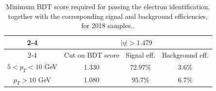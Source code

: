 \begin{table}[h!]
\begin{tabular}{|c|c c c}
\cline{2-4}
  \multicolumn{1}{ c|}{}             & \multicolumn{3}{|c|}{$|\eta| > 1.479$}                        \\            
\cline{2-4} %
   \multicolumn{1}{c|}{}            & Cut on BDT score & Signal eff. & \multicolumn{1}{c|}{Background eff.}  \\
\hline  %
$ 5 < p_T < 10 $ GeV              & 1.330                     & 72.97\%    &  \multicolumn{1}{c|}{3.6\%}     \\
\hline %
$p_T > 10$ GeV                      &  1.080		         & 95.7\%      &  \multicolumn{1}{c|}{6.7\%}		\\
\hline %

     \end{tabular}
\small
    \caption{Minimum BDT score required for passing the electron identification, together with the corresponding signal and background efficiencies, for 2018 samples..}%
    \label{tab:ele_ID_WP}
\end{table}


